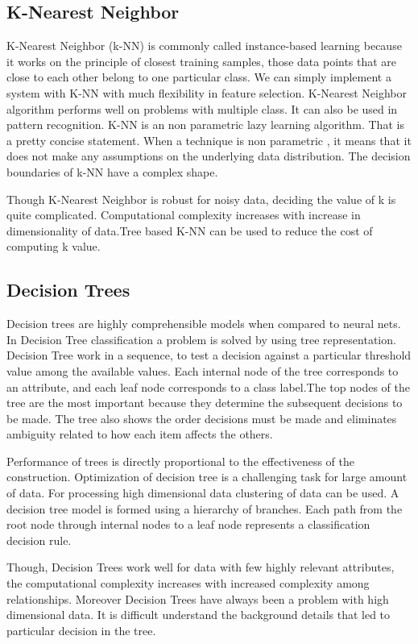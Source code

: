 \subsection{K-Nearest Neighbor}
K-Nearest Neighbor (k-NN) is commonly called instance-based learning\cite{harisinghaney2014text} because it works on the principle of closest training samples, those data points that are close to each other belong to one particular class. We can simply implement a system with K-NN with much flexibility in feature selection. K-Nearest Neighbor algorithm performs well on problems with multiple class. It can also be used in pattern recognition. K-NN is an non parametric lazy learning algorithm. That is a pretty concise statement. When a technique is non parametric , it means that it does not make any assumptions on the underlying data distribution. The decision boundaries of k-NN have a complex shape.
\par
\vspace{0.5cm}
 Though K-Nearest Neighbor is robust for noisy data, deciding the value of k is quite complicated. Computational complexity increases with increase in dimensionality of data.Tree based K-NN can be used to reduce the cost of computing k value.
 
 \subsection{Decision Trees}
 Decision trees are highly comprehensible models when compared to neural nets\cite{chavan2014survey}.
 In Decision Tree classification a problem is solved by using tree representation. Decision Tree work in a sequence, to test a decision against a particular threshold value among the available values. Each internal node of the tree corresponds to an attribute, and each leaf node corresponds to a class label.The top nodes of the tree are the most important because they determine the subsequent decisions to be made. The tree also shows the order decisions must be made and eliminates ambiguity related to how each item affects the others.
\par
\vspace{0.5cm}
Performance of trees is directly proportional to the effectiveness of the construction. Optimization of decision tree is a challenging task for large amount of data. For processing high dimensional data clustering of data can be used.
A decision tree model is formed using a hierarchy of branches. Each path from the root node through internal nodes to a leaf node represents a classification decision rule.
\par
\vspace{0.5cm}
Though, Decision Trees work well for data with few highly relevant attributes, the computational complexity increases with increased complexity among relationships. Moreover Decision Trees have always been a problem with high dimensional data. It is difficult understand the background details that led to particular decision in the tree. 

